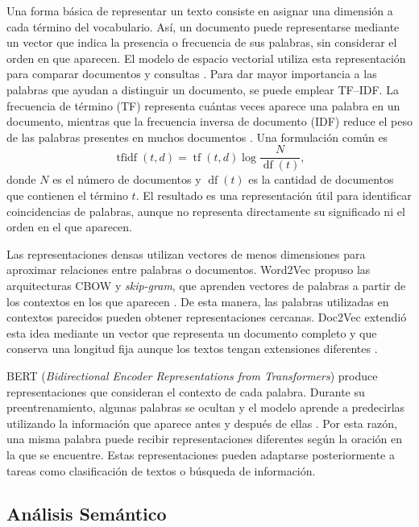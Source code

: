 \documentclass[conference]{IEEEtran}
\begin{document}
Una forma básica de representar un texto consiste en asignar una dimensión a cada término del vocabulario. Así, un documento puede representarse mediante un vector que indica la presencia o frecuencia de sus palabras, sin considerar el orden en que aparecen. El modelo de espacio vectorial utiliza esta representación para comparar documentos y consultas \cite{salton1975}. Para dar mayor importancia a las palabras que ayudan a distinguir un documento, se puede emplear TF--IDF. La frecuencia de término (TF) representa cuántas veces aparece una palabra en un documento, mientras que la frecuencia inversa de documento (IDF) reduce el peso de las palabras presentes en muchos documentos \cite{sparckjones1972}. Una formulación común es
\begin{equation}
\operatorname{tfidf}(t,d)=\operatorname{tf}(t,d)\log\frac{N}{\operatorname{df}(t)},
\end{equation}
donde $N$ es el número de documentos y $\operatorname{df}(t)$ es la cantidad de documentos que contienen el término $t$. El resultado es una representación útil para identificar coincidencias de palabras, aunque no representa directamente su significado ni el orden en el que aparecen.

Las representaciones densas utilizan vectores de menos dimensiones para aproximar relaciones entre palabras o documentos. Word2Vec propuso las arquitecturas CBOW y \textit{skip-gram}, que aprenden vectores de palabras a partir de los contextos en los que aparecen \cite{mikolov2013}. De esta manera, las palabras utilizadas en contextos parecidos pueden obtener representaciones cercanas. Doc2Vec extendió esta idea mediante un vector que representa un documento completo y que conserva una longitud fija aunque los textos tengan extensiones diferentes \cite{le2014}.

BERT (\textit{Bidirectional Encoder Representations from Transformers}) produce representaciones que consideran el contexto de cada palabra. Durante su preentrenamiento, algunas palabras se ocultan y el modelo aprende a predecirlas utilizando la información que aparece antes y después de ellas \cite{devlin2019}. Por esta razón, una misma palabra puede recibir representaciones diferentes según la oración en la que se encuentre. Estas representaciones pueden adaptarse posteriormente a tareas como clasificación de textos o búsqueda de información.

\subsection{Análisis Semántico}
\end{document}
